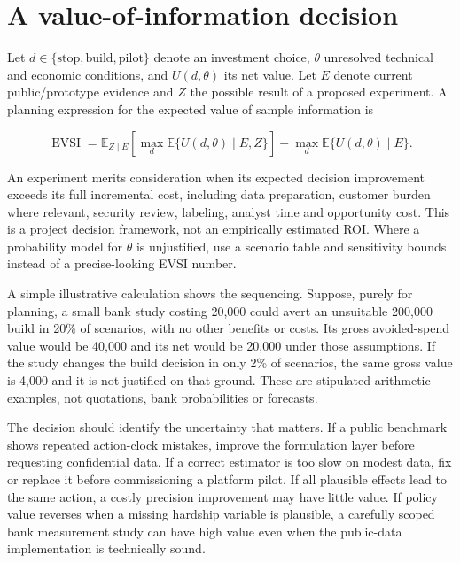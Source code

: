 \hypertarget{a-value-of-information-decision}{%
\section{A value-of-information
decision}\label{a-value-of-information-decision}}

Let \(d\in\{\text{stop},\text{build},\text{pilot}\}\) denote an
investment choice, \(\theta\) unresolved technical and economic
conditions, and \(U(d,\theta)\) its net value. Let \(E\) denote current
public/prototype evidence and \(Z\) the possible result of a proposed
experiment. A planning expression for the expected value of sample
information is

\[
\operatorname{EVSI}
=\mathbb E_{Z\mid E}\!\left[\max_d\mathbb E\{U(d,\theta)\mid E,Z\}\right]
-\max_d\mathbb E\{U(d,\theta)\mid E\}.
\]

An experiment merits consideration when its expected decision
improvement exceeds its full incremental cost, including data
preparation, customer burden where relevant, security review, labeling,
analyst time and opportunity cost. This is a project decision framework,
not an empirically estimated ROI. Where a probability model for
\(\theta\) is unjustified, use a scenario table and sensitivity bounds
instead of a precise-looking EVSI number.

A simple illustrative calculation shows the sequencing. Suppose, purely
for planning, a small bank study costing 20,000 could avert an
unsuitable 200,000 build in 20\% of scenarios, with no other benefits or
costs. Its gross avoided-spend value would be 40,000 and its net would
be 20,000 under those assumptions. If the study changes the build
decision in only 2\% of scenarios, the same gross value is 4,000 and it
is not justified on that ground. These are stipulated arithmetic
examples, not quotations, bank probabilities or forecasts.

The decision should identify the uncertainty that matters. If a public
benchmark shows repeated action-clock mistakes, improve the formulation
layer before requesting confidential data. If a correct estimator is too
slow on modest data, fix or replace it before commissioning a platform
pilot. If all plausible effects lead to the same action, a costly
precision improvement may have little value. If policy value reverses
when a missing hardship variable is plausible, a carefully scoped bank
measurement study can have high value even when the public-data
implementation is technically sound.

